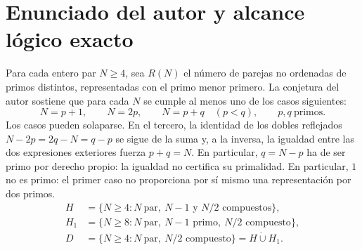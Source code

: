 \documentclass[11pt,a4paper]{article}
\newcommand{\B}[2]{#2}
\newcommand{\B}[2]{#1}
\begin{document}
\section{\B{The author's statement and its exact logical scope}{Enunciado del autor y alcance lógico exacto}}
\B{For each even integer $N\ge4$ let $R(N)$ count unordered distinct-prime pairs, represented with the smaller prime first. The author's conjecture is that at least one of the following cases holds for each such $N$:}{Para cada entero par $N\ge4$, sea $R(N)$ el número de parejas no ordenadas de primos distintos, representadas con el primo menor primero. La conjetura del autor sostiene que para cada $N$ se cumple al menos uno de los casos siguientes:}
\[
 N=p+1,\qquad N=2p,\qquad N=p+q\quad(p<q),
 \qquad p,q\ \B{\text{prime}}{\text{primos}}.
\]
\B{The cases can overlap. In the third case the reflected-doubles identity $N-2p=2q-N=q-p$ follows from the sum, and equality of the two outer expressions conversely forces $p+q=N$. In particular, $q=N-p$ must itself be prime; the equality does not test its primality. In particular $1$ is not prime; the first case need not itself give a representation by two primes.}{Los casos pueden solaparse. En el tercero, la identidad de los dobles reflejados $N-2p=2q-N=q-p$ se sigue de la suma y, a la inversa, la igualdad entre las dos expresiones exteriores fuerza $p+q=N$. En particular, $q=N-p$ ha de ser primo por derecho propio: la igualdad no certifica su primalidad. En particular, $1$ no es primo: el primer caso no proporciona por sí mismo una representación por dos primos.}
\begin{align*}
 H&=\{N\ge4:N\ \B{\text{even},\ N-1\text{ and }N/2\text{ composite}}{\text{par},\ N-1\text{ y }N/2\text{ compuestos}}\},\\
 H_1&=\{N\ge8:N\ \B{\text{even},\ N-1\text{ prime},\ N/2\text{ composite}}{\text{par},\ N-1\text{ primo},\ N/2\text{ compuesto}}\},\\
 D&=\{N\ge4:N\ \B{\text{even},\ N/2\text{ composite}}{\text{par},\ N/2\text{ compuesto}}\}=H\mathbin{\dot\cup} H_1.
\end{align*}
\end{document}
